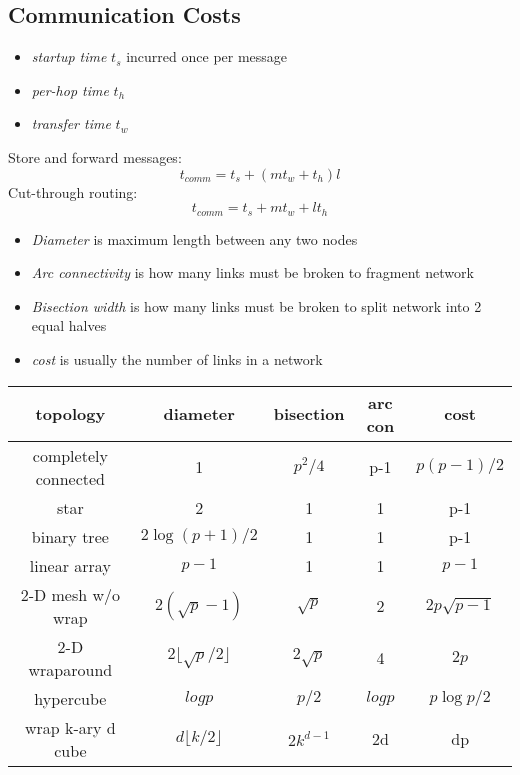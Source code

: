 \documentclass[a4paper,10pt]{article}
\def\floor#1{\lfloor #1 \rfloor}
\begin{document}
\subsection{Communication Costs}
\begin{itemize}
\item \emph{startup time} $t_s$ incurred once per message
\item \emph{per-hop time} $t_h$ 
\item \emph{transfer time} $t_w$
\end{itemize}
Store and forward messages:
$$
t_{comm} = t_s + (mt_w + t_h) l
$$
Cut-through routing:
$$
t_{comm} = t_s + mt_w + lt_h
$$
\begin{itemize}
\item \emph{Diameter} is maximum length between any two nodes
\item \emph{Arc connectivity} is how many links must be broken to fragment network
\item \emph{Bisection width} is how many links must be broken to split network into 2 equal halves
\item \emph{cost} is usually the number of links in a network
\end{itemize}

\begin{center}
\begin{tabular}{|c|cccc|}
\hline
topology & diameter & bisection & arc con & cost \\
\hline
completely connected & 1 & $p^2/4$ & p-1 & $p(p-1)/2$ \\
star & 2 & 1 & 1 & p-1 \\
binary tree & $2\log{(p+1)/2}$ & 1 & 1 & p-1 \\
linear array & $p-1$ & 1 & 1 & $p-1$ \\
2-D mesh w/o wrap & $2(\sqrt{p}-1)$ & $\sqrt{p}$ & 2 & $2p\sqrt{p-1}$ \\
2-D wraparound & $2\floor{\sqrt{p}/2}$ & $2\sqrt{p}$ & 4 & $2p$ \\
hypercube & $log{p}$ & $p/2$ & $log{p}$ & $p\log{p}/2$ \\
wrap k-ary d cube & $d\floor{k/2}$ & $2k^{d-1}$ & 2d & dp \\
\hline
\end{tabular}
\end{center}
\end{document}
